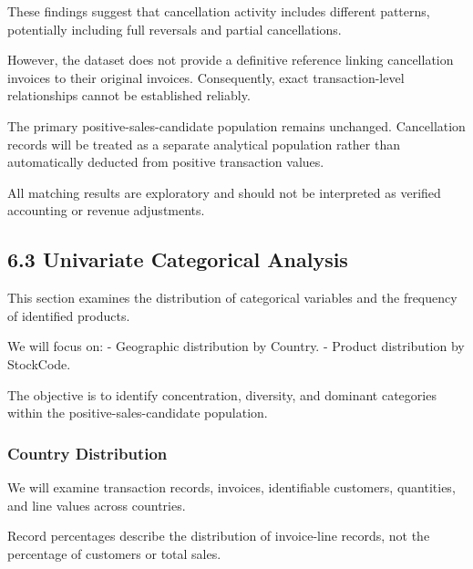 \documentclass[11pt]{article}
\begin{document}
These findings suggest that cancellation activity includes different
patterns, potentially including full reversals and partial
cancellations.

However, the dataset does not provide a definitive reference linking
cancellation invoices to their original invoices. Consequently, exact
transaction-level relationships cannot be established reliably.

The primary positive-sales-candidate population remains unchanged.
Cancellation records will be treated as a separate analytical population
rather than automatically deducted from positive transaction values.

All matching results are exploratory and should not be interpreted as
verified accounting or revenue adjustments.

    \subsection{6.3 Univariate Categorical
Analysis}\label{univariate-categorical-analysis}

This section examines the distribution of categorical variables and the
frequency of identified products.

We will focus on: - Geographic distribution by Country. - Product
distribution by StockCode.

The objective is to identify concentration, diversity, and dominant
categories within the positive-sales-candidate population.

    \subsubsection{Country Distribution}\label{country-distribution}

We will examine transaction records, invoices, identifiable customers,
quantities, and line values across countries.

Record percentages describe the distribution of invoice-line records,
not the percentage of customers or total sales.
\end{document}
